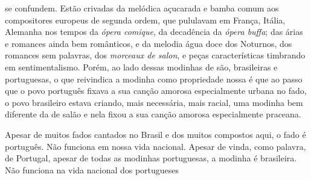 se confundem. Estão crivadas da melódica açucarada e bamba comum aos
compositores europeus de segunda ordem, que pululavam em França, Itália,
Alemanha nos tempos da \textit{ópera comique}, da decadência da \textit{ópera buffa};
das árias e romances ainda bem românticos, e da melodia água doce dos
Noturnos, dos romances sem palavras, dos \textit{morceaux de salon}, e peças
características timbrando em sentimentalismo. Porém, ao lado dessas
modinhas de são, brasileiras e portuguesas, o que reivindica a modinha
como propriedade nossa é que ao passo que o povo português fixava a sua
canção amorosa especialmente urbana no fado, o povo brasileiro estava
criando, mais necessária, mais racial, uma modinha bem diferente da de
salão e nela fixou a sua canção amorosa especialmente praceana.

Apesar de muitos fados cantados no Brasil e dos muitos compostos aqui, o
fado é português. Não funciona em nossa vida nacional. Apesar de vinda,
como palavra, de Portugal, apesar de todas as modinhas portuguesas, a
modinha é brasileira. Não funciona na vida nacional dos portugueses %


